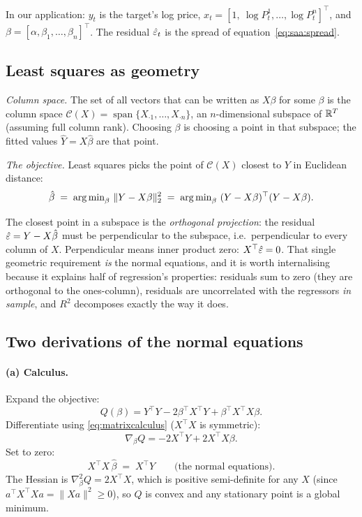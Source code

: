 In our application: $y_t$ is the target's log price, $x_t=[1,\ \log P^{1}_t,\dots,\log
P^{n}_t]^{\top}$, and $\beta=[\alpha,\beta_1,\dots,\beta_n]^{\top}$. The residual
$\hat{\varepsilon}_t$ is the spread of equation~\eqref{eq:saa:spread}.

\subsection{Least squares as geometry}
\label{sec:ols:geometry}

\emph{Column space.} The set of all vectors that can be written as $X\beta$ for some
$\beta$ is the column space $\mathcal C(X)=\operatorname{span}\{X_{\cdot 1},\dots,X_{\cdot n}\}$,
an $n$-dimensional subspace of $\mathbb{R}^T$ (assuming full column rank). Choosing $\beta$ is
choosing a point in that subspace; the fitted values $\hat Y=X\hat\beta$ are that point.

\emph{The objective.} Least squares picks the point of $\mathcal C(X)$ closest to $Y$ in
Euclidean distance:
\begin{equation}
  \hat\beta \;=\; \operatorname{arg\,min}_{\beta}\ \lVert Y-X\beta\rVert_2^2
  \;=\; \operatorname{arg\,min}_{\beta}\ (Y-X\beta)^{\top}(Y-X\beta).
  \label{eq:ols:objective}
\end{equation}

\begin{intuition}
The closest point in a subspace is the \emph{orthogonal projection}: the residual
$\hat{\varepsilon}=Y-X\hat\beta$ must be perpendicular to the subspace, i.e.\ perpendicular to
every column of $X$. Perpendicular means inner product zero: $X^{\top}\hat{\varepsilon}=0$. That
single geometric requirement \emph{is} the normal equations, and it is worth internalising
because it explains half of regression's properties: residuals sum to zero (they are
orthogonal to the ones-column), residuals are uncorrelated with the regressors
\emph{in sample}, and $R^2$ decomposes exactly the way it does.
\end{intuition}

\subsection{Two derivations of the normal equations}
\label{sec:ols:normal}

\paragraph{(a) Calculus.} Expand the objective:
\[
  Q(\beta) = Y^{\top}Y - 2\beta^{\top}X^{\top}Y + \beta^{\top}X^{\top}X\beta .
\]
Differentiate using \eqref{eq:matrixcalculus} ($X^{\top}X$ is symmetric):
\[
  \nabla_\beta Q = -2X^{\top}Y + 2X^{\top}X\beta .
\]
Set to zero:
\begin{equation}
  X^{\top}X\,\hat\beta \;=\; X^{\top}Y
  \qquad\text{(the normal equations)}.
  \label{eq:normal}
\end{equation}
The Hessian is $\nabla^2_\beta Q = 2X^{\top}X$, which is positive semi-definite for any
$X$ (since $a^{\top}X^{\top}Xa=\lVert Xa\rVert^2\ge0$), so $Q$ is convex and any
stationary point is a global minimum.

